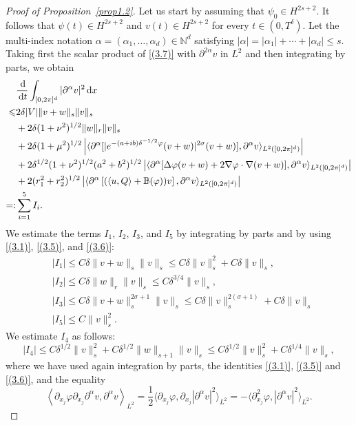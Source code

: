 \documentclass[review]{elsarticle}
\theoremstyle{dotless}
\def\d{{\,\rm d}}
\def \leq{\leqslant}
\numberwithin{equation}{section}
\begin{document}
\begin{proof}[Proof of Proposition~\ref{prop1.2}]
Let us start by assuming that $ \psi_0\in  H^{2s+2}$. It follows that $ \psi(t)\in H^{2s+2}$ and $ v(t)\in H^{2s+2}$ for every $ t\in(0,T^\delta) $.
Let the multi-index notation $\alpha=\left(\alpha_1, \ldots, \alpha_d\right) \in \mathbb{N}^d$ satisfying $|\alpha|=\left|\alpha_1\right|+\cdots+\left|\alpha_d\right| \leq s$. Taking first the scalar product of \eqref{(3.7)} with $\partial^{2 \alpha} v$ in $L^2$ and then integrating by parts, we obtain
\begin{align}
	&\frac{\d}{\d t}\int_{[0,2\pi]^d}|\partial^\alpha v|^2\d x \nonumber\\
	\leq &2\delta|V|\|v+w\|_s\|v\|_s \nonumber\\
	& +2 \delta  (1+\nu^2)^{1/2}\|w\|_r\|v\|_s\nonumber\\
	& +2 \delta (1+\mu^2)^{1/2}\left| \langle  \partial^\alpha[| e^{-(a+ib)\delta^{-1/2} \varphi}(v+w) |^{2 \sigma}(v+w)], \partial^{\alpha} v\rangle_{L^2([0,2\pi]^d)} \right|\nonumber\\
	& +2 \delta^{1 / 2} (1+\nu^2)^{1/2} (a^2+b^2)^{1/2} \left|  \langle\partial^\alpha[\Delta \varphi(v+w) + 2\nabla \varphi \cdot \nabla(v+w)], \partial^{\alpha} v \rangle_{L^2([0,2\pi]^d)}\right|\nonumber\\
	&  +2 (r_1^2+r_2^2)^{1/2}\left| \langle\partial^\alpha\left[(\langle u, Q\rangle+\mathbb{B}(\varphi)) v\right], \partial^{\alpha} v \rangle_{L^2([0,2\pi]^d)}\right|\nonumber\\
	=:&\sum_{i=1}^{5}I_i. \label{(3.9)}
\end{align}
We estimate the terms $I_1,\, I_2,\, I_3$, and $I_5$ by integrating by parts and by using \eqref{(3.1)}, \eqref{(3.5)}, and \eqref{(3.6)}:
$$
\begin{aligned}
	& \left|I_1\right| \leq C \delta\|v+w\|_s\|v\|_s \leq  C \delta\|v\|_s^2+C \delta\|v\|_s, \\
	& \left|I_2\right| \leq C \delta\|w\|_r\|v\|_s \leq C \delta^{3 / 4}\|v\|_s, \\
	& \left|I_3\right| \leq C \delta\|v+w\|_s^{2 \sigma+1}\|v\|_s \leq C \delta\|v\|_s^{2(\sigma+1)}+C \delta\|v\|_s \\
	& \left|I_5\right| \leq C\|v\|_s^2 .
\end{aligned}
$$
We estimate $I_4$ as follows:
$$
\left|I_4\right| \leq C \delta^{1 / 2}\|v\|_s^2+C \delta^{1 / 2}\|w\|_{s+1}\|v\|_s \leq C \delta^{1 / 2}\|v\|_s^2+C \delta^{1 / 4}\|v\|_s ,
$$
where we have used again integration by parts, the identities \eqref{(3.1)}, \eqref{(3.5)} and \eqref{(3.6)}, and the equality
$$
\left\langle\partial_{x_j} \varphi \partial_{x_j} \partial^\alpha v, \partial^\alpha v\right\rangle_{L^2}=\frac{1}{2} \langle\partial_{x_j} \varphi, \partial_{x_j}\left| \partial^\alpha v\right|^2 \rangle_{L^2}=- \langle\partial_{x_j}^2 \varphi,\left| \partial^\alpha v\right|^2 \rangle_{L^2}.
$$
\end{proof}
\end{document}
